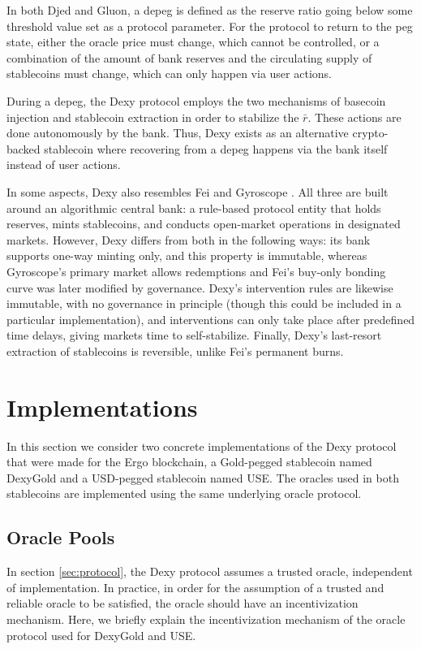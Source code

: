 \documentclass{ifcolog}
\newcommand{\rr}{\bar{r}}
\newcommand{\dx}{Dexy}
\newcommand{\dxg}{DexyGold}
\newcommand{\dxusd}{USE}
\begin{document}
In both Djed and Gluon, a depeg is defined as the reserve ratio going below some threshold value set as a protocol parameter. 
For the protocol to return to the peg state, either the oracle price must change, which cannot be controlled, or 
a combination of the amount of bank reserves and the circulating supply of stablecoins must change, which can only happen via user 
actions.

During a depeg, the Dexy protocol employs the two mechanisms of basecoin injection and stablecoin extraction in order 
to stabilize the $\rr$. These actions are done autonomously by the bank. Thus, Dexy exists as an alternative 
crypto-backed stablecoin where recovering from a depeg happens via the bank itself instead of user actions.

In some aspects, \dx{} also resembles Fei \cite{Fei} and Gyroscope \cite{Gyroscope}.
All three are built around an algorithmic central bank: a rule-based protocol entity that
holds reserves, mints stablecoins, and conducts open-market operations in designated markets.
However, \dx{} differs from both in the following ways: 
its bank supports one-way minting only, and this property is immutable, whereas Gyroscope's
primary market allows redemptions and Fei's buy-only bonding curve was later modified by governance.
\dx{}'s intervention rules are likewise immutable, with no governance in principle 
(though this could be included in a particular implementation), and interventions can only
take place after predefined time delays, giving markets time to self-stabilize.
Finally, \dx{}'s last-resort extraction of stablecoins is reversible, unlike Fei's permanent burns.

\section{Implementations}
\label{sec:implementations}

In this section we consider two concrete implementations of the \dx{} protocol that were made for the Ergo blockchain, 
a Gold-pegged stablecoin named \dxg{} and a USD-pegged stablecoin named \dxusd{}. The oracles used in both stablecoins are
implemented using the same underlying oracle protocol.

\subsection{Oracle Pools}
\label{subsec:oracle}

In section \ref{sec:protocol}, the Dexy protocol assumes a trusted oracle, independent of implementation. 
In practice, in order for the assumption of a trusted and reliable oracle to be satisfied, the oracle should 
have an incentivization mechanism. Here, we briefly explain the incentivization mechanism of the oracle 
protocol used for \dxg{} and \dxusd{}.
\end{document}
